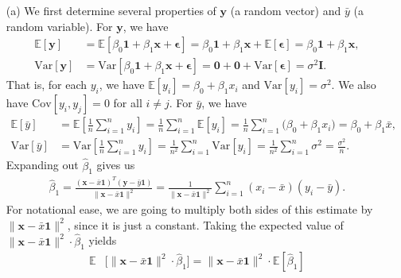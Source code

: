 \documentclass[10pt]{article}
\begin{document}
\begin{itemize}
    \item[(a)] We first determine several properties of \(\mathbf{y}\) (a random vector) and \(\bar{y}\) (a random variable). For \(\mathbf{y}\), we have
    \begin{align*}
        \mathbb{E}[\mathbf{y}] &= \mathbb{E}[\beta_0 \mathbf{1} + \beta_1 \mathbf{x} + \bm{\epsilon}] 
        = \beta_0 \mathbf{1} + \beta_1 \mathbf{x} + \mathbb{E}[\bm{\epsilon}] 
        = \beta_0 \mathbf{1} + \beta_1 \mathbf{x}, \\
        \mathrm{Var}[\mathbf{y}] &= \mathrm{Var}[\beta_0 \mathbf{1} + \beta_1 \mathbf{x} + \bm{\epsilon}]
        = \mathbf{0} + \mathbf{0} + \mathrm{Var}[\bm{\epsilon}] 
        = \sigma^2 \mathbf{I}.
    \end{align*}
    That is, for each \(y_i\), we have \(\mathbb{E}[y_i] = \beta_0 + \beta_1 x_i\) and \(\mathrm{Var}[y_i] = \sigma^2\). 
    We also have \(\mathrm{Cov}[y_i,y_j] = 0\) for all \(i \neq j\). 
    For \(\bar{y}\), we have
    \begin{align*}
        \mathbb{E}[\bar{y}] &= \mathbb{E} \left[ \frac{1}{n} \sum_{i=1}^n y_i \right]
        = \frac{1}{n} \sum_{i=1}^n \mathbb{E}[y_i]
        = \frac{1}{n} \sum_{i=1}^n \big( \beta_0 + \beta_1 x_i \big)
        = \beta_0 + \beta_1 \bar{x}, \\
        \mathrm{Var}[\bar{y}] &= \mathrm{Var} \left[ \frac{1}{n} \sum_{i=1}^n y_i \right]
        = \frac{1}{n^2} \sum_{i=1}^n \mathrm{Var}[y_i]
        = \frac{1}{n^2} \sum_{i=1}^n \sigma^2
        = \frac{\sigma^2}{n}.
    \end{align*}
    Expanding out \(\hat{\beta}_1\) gives us 
    \begin{align*}
        \hat{\beta}_1 = \frac{(\mathbf{x} - \bar{x}\mathbf{1})^T(\mathbf{y} - \bar{y}\mathbf{1})}{\|\mathbf{x} - \bar{x}\mathbf{1}\|^2}
        = \frac{1}{\|\mathbf{x} - \bar{x}\mathbf{1}\|^2} \sum_{i=1}^n (x_i - \bar{x})(y_i - \bar{y}).
    \end{align*}
    For notational ease, we are going to multiply both sides of this estimate by \(\|\mathbf{x} - \bar{x}\mathbf{1}\|^2\), since it is just a constant. 
    Taking the expected value of \(\|\mathbf{x} - \bar{x}\mathbf{1}\|^2 \cdot \hat{\beta}_1\) yields 
    \begin{align*}
        \mathbb{E} &\Big[ \|\mathbf{x} - \bar{x}\mathbf{1}\|^2 \cdot \hat{\beta}_1 \Big] = \|\mathbf{x} - \bar{x}\mathbf{1}\|^2 \cdot \mathbb{E}[\hat{\beta}_1] 

\end{align*}
\end{itemize}
\end{document}
